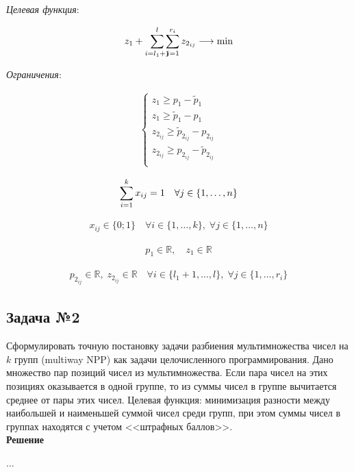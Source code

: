 \documentclass[14pt,fleqn]{extarticle}
\begin{document}
	\textit{Целевая функция}:
	\begin{ceqn}
		\begin{align*}
			z_1 + \smashoperator[r]{\sum_{i=l_1+1}^{l}} \smashoperator[r]{\sum_{j=1}^{r_i}} z_{2_{ij}} \longrightarrow \min
		\end{align*}
	\end{ceqn}

	\textit{Ограничения}:
	\begin{ceqn}
		\begin{align*}
			\begin{cases}
				z_1 \geq p_1 - \widetilde{p}_{1}\\
				z_1 \geq \widetilde{p}_{1} - p_1\\
				z_{2_{ij}} \geq \widetilde{p}_{2_{ij}} - p_{2_{ij}}\\
				z_{2_{ij}} \geq p_{2_{ij}} - \widetilde{p}_{2_{ij}}\\
			\end{cases}
		\end{align*}
	\end{ceqn}

	\begin{ceqn}
		\begin{align*}
			\smashoperator[r]{\sum_{i=1}^{k}} x_{ij} = 1 \quad \forall j \in \{1, \dots, n\}
		\end{align*}
	\end{ceqn}

	\begin{ceqn}
		\begin{align*}
			x_{ij} \in \{0;1\} \quad \forall i \in \{1, \dots, k\}, \; \forall j \in \{1, \dots, n\}
		\end{align*}
	\end{ceqn}

	\begin{ceqn}
		\begin{align*}
			p_1 \in \mathbb{R}, \quad z_1 \in \mathbb{R}
		\end{align*}
	\end{ceqn}

	\begin{ceqn}
		\begin{align*}
			p_{2_{ij}} \in \mathbb{R}, \; z_{2_{ij}} \in \mathbb{R} \quad \forall i \in \{l_1+1, \dots, l\}, \; \forall j \in \{1, \dots, r_i\}
		\end{align*}
	\end{ceqn}


	\newpage
    \subsection*{Задача №2}
    Сформулировать точную постановку задачи разбиения мультимножества чисел на $k$ групп (multiway NPP) как задачи целочисленного программирования. Дано множество пар позиций чисел из мультимножества. Если пара чисел на этих позициях оказывается в одной группе, то из суммы чисел в группе вычитается среднее от пары этих чисел. Целевая функция: минимизация разности между наибольшей и наименьшей суммой чисел среди групп, при этом суммы чисел в группах находятся с учетом <<штрафных баллов>>.\\
    
    \textbf{Решение}
    
    ...
\end{document}
